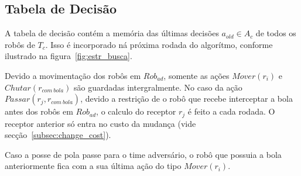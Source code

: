 \subsection{Tabela de Decisão}\label{sec:tab_dec}
A tabela de decisão contém a memória das últimas
decisões $a_{old} \in A_c$ de todos os robôs de $T_c$.
Isso é incorporado ná próxima rodada do algorítmo,
conforme ilustrado na figura~\ref{fig:estr_busca}.


Devido a movimentação dos robôs em $Rob_{ad}$, somente as
ações $Mover(r_i)$ e $Chutar(r_{com{\ }bola})$ são guardadas
intergralmente. No caso da ação $Passar(r_j, r_{com{\ }bola})$,
devido a restrição de o robô que recebe interceptar a bola
antes dos robôs em $Rob_{ad}$, o calculo do receptor $r_j$ é
feito a cada rodada. O receptor anterior só entra no custo
da mudança (vide secção~\ref{subsec:change_cost}). 

Caso a posse de pola passe para o time adversário, o robô
que possuia a bola anteriormente fica com a sua última
ação do tipo $Mover(r_i)$.
